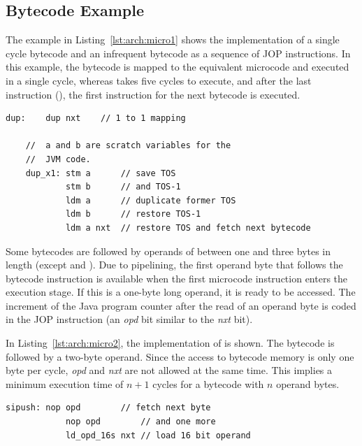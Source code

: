 \subsection{Bytecode Example}

The example in Listing~\ref{lst:arch:micro1} shows the
implementation of a single cycle bytecode and an infrequent bytecode
as a sequence of JOP instructions. In this example, the 
bytecode is mapped to the equivalent  microcode and
executed in a single cycle, whereas  takes five cycles
to execute, and after the last instruction (), the
first instruction for the next bytecode is executed.

\begin{lstlisting}[caption={Implementation of \code{dup} and \code{dup\_x1}},
label=lst:arch:micro1]
    dup:    dup nxt    // 1 to 1 mapping

    //  a and b are scratch variables for the
    //  JVM code.
    dup_x1: stm a      // save TOS
            stm b      // and TOS-1
            ldm a      // duplicate former TOS
            ldm b      // restore TOS-1
            ldm a nxt  // restore TOS and fetch next bytecode
\end{lstlisting}

Some bytecodes are followed by operands of between one and three
bytes in length (except  and ).
Due to pipelining, the first operand byte that follows the bytecode
instruction is available when the first microcode instruction enters
the execution stage. If this is a one-byte long operand, it is ready
to be accessed. The increment of the Java program counter after the
read of an operand byte is coded in the JOP instruction (an
\emph{opd} bit similar to the \emph{nxt} bit).

In Listing~\ref{lst:arch:micro2}, the implementation of
 is shown. The bytecode is followed by a two-byte
operand. Since the access to bytecode memory is only one byte per
cycle, \emph{opd} and \emph{nxt} are not allowed at the same time.
This implies a minimum execution time of $n+1$ cycles for a bytecode
with $n$ operand bytes.

\begin{lstlisting}[caption={Bytecode operand load},
label=lst:arch:micro2]
    sipush: nop opd        // fetch next byte
            nop opd        // and one more
            ld_opd_16s nxt // load 16 bit operand
\end{lstlisting}


